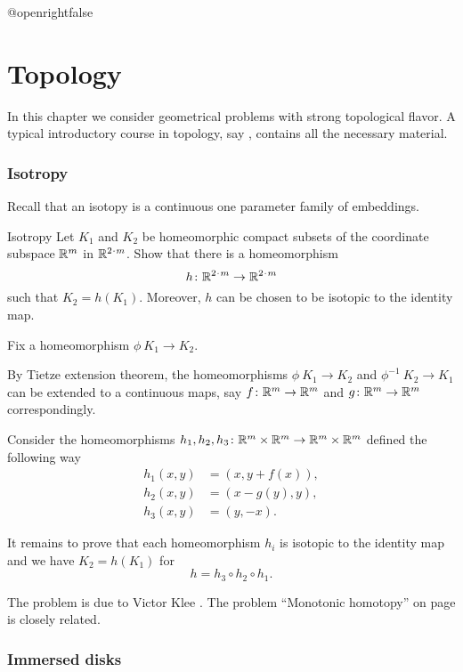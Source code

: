 \csname @openrightfalse\endcsname
\chapter{Topology}

In this chapter we consider geometrical problems with strong topological flavor.
A typical introductory course in topology, say \cite{kosniowski},
contains all the necessary material.


\subsection*{Isotropy}

Recall that an isotopy is a continuous one parameter family of embeddings.

\begin{pr}{}{Isotropy}\label{Isotropy}
Let $K_1$ and $K_2$ be homeomorphic compact subsets of the coordinate subspace $\mathbb{R}^m$ in $\RR^{2\cdot m}$.
Show that there is a homeomorphism 
\[h\:\RR^{2\cdot m}\z\to \RR^{2\cdot m}\] 
such that $K_2=h(K_1)$.
Moreover, $h$ can be chosen to be isotopic to the identity map.
\end{pr}

Fix a homeomorphism $\phi\:K_1\to K_2$.

By Tietze extension theorem,
the homeomorphisms $\phi\:K_1\to K_2$ and $\phi^{-1}\:K_2\to K_1$ can be extended to a continuous maps,
say $f\colon\mathbb{R}^m\to \mathbb{R}^m$ and $g\colon\mathbb{R}^m\to \mathbb{R}^m$ correspondingly.

Consider the homeomorphisms
$h_1, h_2, h_3\colon\mathbb{R}^m\times\mathbb{R}^m\to\mathbb{R}^m\times\mathbb{R}^m$ defined the following way
\begin{align*}
h_1(x,y)&=(x,y+f(x)),
\\
h_2(x,y)&=(x-g(y),y),
\\ 
h_3(x,y)&=(y,-x).
\end{align*}

It remains to prove that each homeomorphism $h_i$ is isotopic to the identity map and we have $K_2=h(K_1)$ for
\[h=h_3\circ h_2\circ h_1.\]
\qedsf 

The problem is due to Victor Klee \cite[see][]{klee}.
The problem ``Monotonic homotopy'' on page \pageref{mono-homotopy} is closely related.

\subsection*{Immersed disks}

